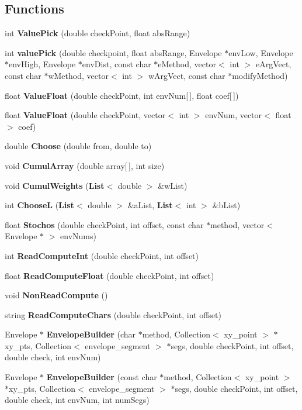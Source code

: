 \subsection*{Functions}
\begin{CompactItemize}
\item 
int {\bf Value\-Pick} (double check\-Point, float abs\-Range)
\item 
int {\bf value\-Pick} (double checkpoint, float abs\-Range, Envelope $\ast$env\-Low, Envelope $\ast$env\-High, Envelope $\ast$env\-Dist, const  char $\ast$e\-Method, vector$<$ int $>$ e\-Arg\-Vect, const  char $\ast$w\-Method, vector$<$ int $>$ w\-Arg\-Vect, const  char $\ast$modify\-Method)
\item 
float {\bf Value\-Float} (double check\-Point, int env\-Num[$\,$], float coef[$\,$])
\item 
float {\bf Value\-Float} (double check\-Point, vector$<$ int $>$ env\-Num, vector$<$ float $>$ coef)
\item 
double {\bf Choose} (double from, double to)
\item 
void {\bf Cumul\-Array} (double array[$\,$], int size)
\item 
void {\bf Cumul\-Weights} ({\bf List}$<$ double $>$ \&w\-List)
\item 
int {\bf Choose\-L} ({\bf List}$<$ double $>$ \&a\-List, {\bf List}$<$ int $>$ \&b\-List)
\item 
float {\bf Stochos} (double check\-Point, int offset, const  char $\ast$method, vector$<$ Envelope $\ast$ $>$ env\-Nums)
\item 
int {\bf Read\-Compute\-Int} (double check\-Point, int offset)
\item 
float {\bf Read\-Compute\-Float} (double check\-Point, int offset)
\item 
void {\bf Non\-Read\-Compute} ()
\item 
string {\bf Read\-Compute\-Chars} (double check\-Point, int offset)
\item 
Envelope $\ast$ {\bf Envelope\-Builder} (char $\ast$method, Collection$<$ xy\_\-point $>$ $\ast$xy\_\-pts, Collection$<$ envelope\_\-segment $>$ $\ast$segs, double check\-Point, int offset, double check, int env\-Num)
\item 
Envelope $\ast$ {\bf Envelope\-Builder} (const  char $\ast$method, Collection$<$ xy\_\-point $>$ $\ast$xy\_\-pts, Collection$<$ envelope\_\-segment $>$ $\ast$segs, double check\-Point, int offset, double check, int env\-Num, int num\-Segs)
\item 

\end{CompactItemize}
